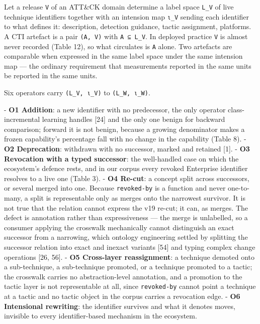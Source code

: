 \documentclass[11pt,a4paper]{article}
\begin{document}
Let a release \texttt{V} of an ATT\&CK domain determine a label space \texttt{L\_V} of live technique identifiers together with an intension map \texttt{ι\_V} sending each identifier to what defines it: description, detection guidance, tactic assignment, platforms. A CTI artefact is a pair \texttt{(A, V)} with \texttt{A ⊆ L\_V}. In deployed practice \texttt{V} is almost never recorded (Table 12), so what circulates is \texttt{A} alone. Two artefacts are comparable when expressed in the same label space under the same intension map — the ordinary requirement that measurements reported in the same units be reported in the same units.

Six operators carry \texttt{(L\_V, ι\_V)} to \texttt{(L\_W, ι\_W)}.

- \textbf{O1 Addition}: a new identifier with no predecessor, the only operator class-incremental learning handles [24] and the only one benign for backward comparison; forward it is not benign, because a growing denominator makes a frozen capability's percentage fall with no change in the capability (Table 8).
- \textbf{O2 Deprecation}: withdrawn with no successor, marked and retained [1].
- \textbf{O3 Revocation with a typed successor}: the well-handled case on which the ecosystem's defence rests, and in our corpus every revoked Enterprise identifier resolves to a live one (Table 3).
- \textbf{O4 Re-cut}: a concept split across successors, or several merged into one. Because \texttt{revoked-by} is a function and never one-to-many, a split is representable only as merges onto the narrowest survivor. It is not true that the relation cannot express the v19 re-cut; it can, as merges. The defect is annotation rather than expressiveness — the merge is unlabelled, so a consumer applying the crosswalk mechanically cannot distinguish an exact successor from a narrowing, which ontology engineering settled by splitting the successor relation into exact and inexact variants [54] and typing complex change operations [26, 56].
- \textbf{O5 Cross-layer reassignment}: a technique demoted onto a sub-technique, a sub-technique promoted, or a technique promoted to a tactic; the crosswalk carries no abstraction-level annotation, and a promotion to the tactic layer is not representable at all, since \texttt{revoked-by} cannot point a technique at a tactic and no tactic object in the corpus carries a revocation edge.
- \textbf{O6 Intensional rewriting}: the identifier survives and what it denotes moves, invisible to every identifier-based mechanism in the ecosystem.
\end{document}
